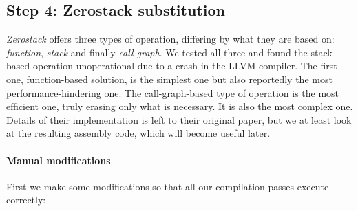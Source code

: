 \documentclass[a4paper,10pt,openright]{memoir}
\newcommand{\term}[1]{\textit{#1}}
\begin{document}
\subsection{Step 4: Zerostack substitution}

\term{Zerostack} offers three types of operation, differing by what 
they are based on: \term{function}, \term{stack} and finally 
\term{call-graph}. We tested all three and found the stack-based 
operation unoperational due to a crash in the LLVM compiler. The first one, function-based 
solution, is the simplest one but also reportedly\cite{whatyouc} the 
most performance-hindering one. The call-graph-based type of operation 
is the most efficient one, truly erasing only what is necessary. It is 
also the most complex one. Details of their implementation is left to 
their original paper\cite{whatyouc}, but we at least look at the 
resulting assembly code, which will become useful later.

\paragraph{Manual modifications}

First we make some modifications so that all our compilation passes 
execute correctly:
\end{document}
